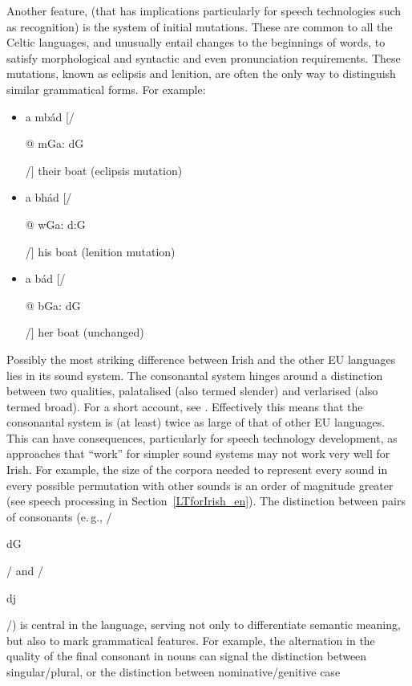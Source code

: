 \begin{multicols}{2}
Another feature, (that has implications particularly for speech technologies such as recognition) is the system of  initial mutations. These are common to all the Celtic languages, and unusually entail changes to the beginnings of words, to satisfy morphological and syntactic and even pronunciation requirements. These mutations, known as eclipsis and lenition, are often the only way to distinguish similar grammatical forms. For example:

\begin{itemize}
\item a mbád [/\begin{IPA}@ m\super Ga: d\super G\end{IPA}/] their boat (eclipsis mutation)
\item a bhád [/\begin{IPA}@ w\super Ga: d:G\end{IPA}/] his boat (lenition mutation)
\item a bád [/\begin{IPA}@ b\super Ga: d\super G\end{IPA}/] her boat (unchanged)
\end{itemize}


Possibly the most striking difference between Irish and the other EU languages lies in its sound system. The consonantal system hinges around a distinction between two qualities, palatalised (also termed slender) and verlarised (also termed broad). For a short account, see \cite{ipaguide}. Effectively this means that the consonantal system is (at least) twice as large of that of other EU languages.  This can have consequences, particularly for speech technology development, as approaches that ``work'' for simpler sound systems may not work very well for Irish. For example, the size of the corpora needed to represent every sound in every possible permutation with other sounds is an order of magnitude greater (see speech processing in Section~\ref{LTforIrish_en}). The distinction between pairs of consonants (e.\,g., /\begin{IPA}d\super G\end{IPA}/ and /\begin{IPA}d\super j\end{IPA}/) is central in the language, serving not only to differentiate semantic meaning, but also to mark grammatical features. For example, the alternation in the quality of the final consonant in nouns can signal the distinction between singular/plural, or the distinction between nominative/genitive case


\end{multicols}
